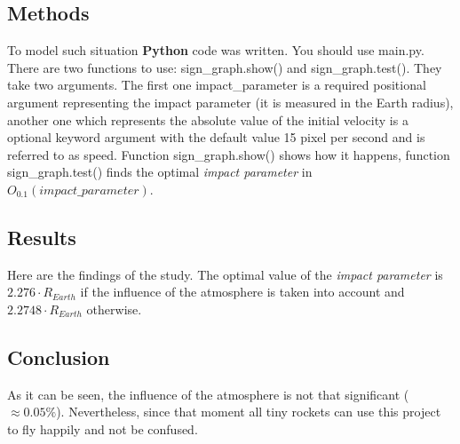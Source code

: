 \documentclass[a4paper,12pt]{article}
\begin{document}
\subsection*{Methods}
To model such situation \textbf{Python} code was written. You should use
\colorbox{gray!30}{main.py}. There are two functions to use:
\colorbox{gray!30}{sign\_graph.show()} and 
\colorbox{gray!30}{sign\_graph.test()}. They take two arguments.
The first one \colorbox{gray!30}{impact\_parameter} is a required positional
argument representing the impact parameter (it is measured in the 
Earth radius), another one which represents the absolute value of the
initial velocity is a optional keyword argument with the default value 15 pixel 
per second and is referred to as \colorbox{gray!30}{speed}. 
Function \colorbox{gray!30}{sign\_graph.show()} shows how it happens, 
function \colorbox{gray!30}{sign\_graph.test()} finds the optimal 
\textit{impact parameter} in \textit{$O_{0.1}(impact\_parameter)$}.
\subsection*{Results}
Here are the findings of the study. The optimal value of the \textit{impact parameter} 
is $2.276 \cdot R_{Earth}$ if the influence of the atmosphere is taken into account 
and $2.2748 \cdot R_{Earth}$ otherwise.
\subsection*{Conclusion}
As it can be seen, the influence of the atmosphere is not that significant 
($\approx 0.05\%$). Nevertheless, since that moment all tiny rockets can 
use this project to fly happily and not be confused.
\end{document}
